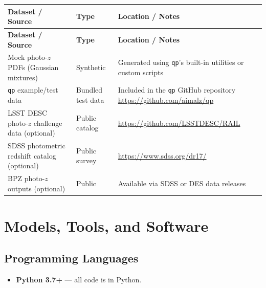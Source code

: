 \documentclass[11pt,a4paper]{article}
\begin{document}
\begin{longtable}{p{4.5cm} p{3.5cm} p{6cm}}
\toprule
\textbf{Dataset / Source} & \textbf{Type} & \textbf{Location / Notes} \\
\midrule
\endfirsthead
\toprule
\textbf{Dataset / Source} & \textbf{Type} & \textbf{Location / Notes} \\
\midrule
\endhead
Mock photo-$z$ PDFs (Gaussian mixtures) & Synthetic & Generated using \texttt{qp}'s built-in utilities or custom scripts \\
\midrule
\texttt{qp} example/test data & Bundled test data & Included in the \texttt{qp} GitHub repository \newline \url{https://github.com/aimalz/qp} \\
\midrule
LSST DESC photo-$z$ challenge data (optional) & Public catalog & \url{https://github.com/LSSTDESC/RAIL} \\
\midrule
SDSS photometric redshift catalog (optional) & Public survey & \url{https://www.sdss.org/dr17/} \\
\midrule
BPZ photo-$z$ outputs (optional) & Public & Available via SDSS or DES data releases \\
\bottomrule
\end{longtable}

\section{Models, Tools, and Software}

\subsection{Programming Languages}
\begin{itemize}
  \item \textbf{Python 3.7+} --- all code is in Python.
\end{itemize}
\end{document}
